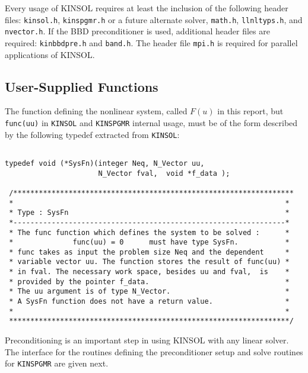 \documentclass[11pt]{article}
\begin{document}
Every usage of KINSOL requires at least the inclusion of the following header
files:  {\tt kinsol.h}, {\tt kinspgmr.h} or a future alternate solver, 
{\tt math.h}, {\tt llnltyps.h}, and {\tt nvector.h}. If the BBD preconditioner is
used, additional header files are required: {\tt kinbbdpre.h} and {\tt band.h}.
The header file {\tt mpi.h} is required for parallel applications of KINSOL.



\subsection{User-Supplied Functions}

The function defining the nonlinear system, called $F(u)$ in this report,
but {\tt func(uu)} in {\tt KINSOL} and {\tt KINSPGMR} internal usage, must be of
the form described by the following typedef extracted from {\tt KINSOL}:

\small
\begin{verbatim}

typedef void (*SysFn)(integer Neq, N_Vector uu, 
                      N_Vector fval,  void *f_data );

 /******************************************************************
 *                                                                *
 * Type : SysFn                                                   *
 *----------------------------------------------------------------*        
 * The func function which defines the system to be solved :      *
 *              func(uu) = 0      must have type SysFn.           *
 * func takes as input the problem size Neq and the dependent     *
 * variable vector uu. The function stores the result of func(uu) *
 * in fval. The necessary work space, besides uu and fval,  is    *
 * provided by the pointer f_data.                                *
 * The uu argument is of type N_Vector.                           *
 * A SysFn function does not have a return value.                 *
 *                                                                *
 ******************************************************************/

\end{verbatim}
\normalsize

Preconditioning is an important step in using KINSOL with any linear
solver. The interface for the routines defining the preconditioner
setup and solve routines for {\tt KINSPGMR} are given next.
\end{document}
